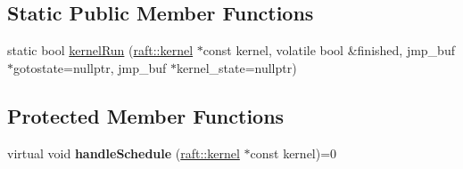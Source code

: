 \subsection*{Static Public Member Functions}
\begin{DoxyCompactItemize}
\item 
static bool \hyperlink{class_schedule_acf28b4a4231e693585751a035873615c}{kernel\+Run} (\hyperlink{classraft_1_1kernel}{raft\+::kernel} $\ast$const kernel, volatile bool \&finished, jmp\+\_\+buf $\ast$gotostate=nullptr, jmp\+\_\+buf $\ast$kernel\+\_\+state=nullptr)
\end{DoxyCompactItemize}
\subsection*{Protected Member Functions}
\begin{DoxyCompactItemize}
\item 
\hypertarget{class_schedule_addff3f2e72caab274963cc888faa2f6b}{}\label{class_schedule_addff3f2e72caab274963cc888faa2f6b} 
virtual void {\bfseries handle\+Schedule} (\hyperlink{classraft_1_1kernel}{raft\+::kernel} $\ast$const kernel)=0
\end{DoxyCompactItemize}
